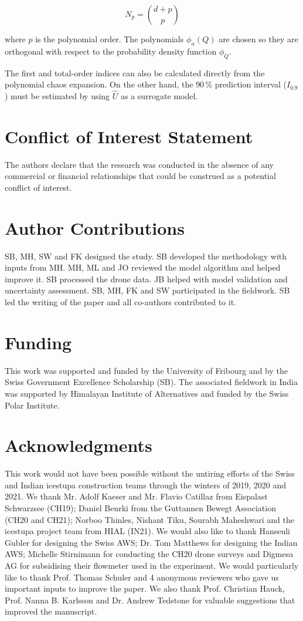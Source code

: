 \documentclass[utf8]{frontiersSCNS}
\begin{document}
\begin{equation}
  N_p = \binom{d+p}{p}
\end{equation}

where $p$ is the polynomial order. The polynomials $\phi_n(Q)$ are chosen so they are orthogonal with respect to the
probability density function $\phi_Q$.

The first and total-order indices can also be calculated directly from the polynomial chaos expansion. On the
other hand, the $90\, \%$ prediction interval ($I_{0.9}$) must be estimated by using $\hat{U}$ as a surrogate
model.

\section*{Conflict of Interest Statement} The authors declare that the research was conducted in the absence of
any commercial or financial relationships that could be construed as a potential conflict of interest.

\section*{Author Contributions} SB, MH, SW and FK designed the study.  SB developed the methodology with inputs
from MH.  MH, ML and JO reviewed the model algorithm and helped improve it. SB processed the drone data. JB helped
with model validation and uncertainty assessment. SB, MH, FK and SW participated in the fieldwork.  SB led the
writing of the paper and all co-authors contributed to it.

\section*{Funding} This work was supported and funded by the University of Fribourg and by the Swiss Government
Excellence Scholarship (SB). The associated fieldwork in India was supported by Himalayan Institute of
Alternatives and funded by the Swiss Polar Institute.

\section*{Acknowledgments} This work would not have been possible without the untiring efforts of the Swiss and
Indian icestupa construction teams through the winters of 2019, 2020 and 2021. We thank Mr. Adolf Kaeser and Mr.
Flavio Catillaz from Eispalast Schwarzsee (CH19); Daniel Beurki from the Guttannen Bewegt Association (CH20 and
CH21); Norboo Thinles, Nishant Tiku, Sourabh Maheshwari and the icestupa project team from HIAL (IN21).  We
would also like to thank Hanseuli Gubler for designing the Swiss AWS; Dr. Tom Matthews for designing the Indian
AWS; Michelle Stirnimann for conducting the CH20 drone surveys and Digmesa AG for subsidising their flowmeter
used in the experiment.  We would particularly like to thank Prof. Thomas Schuler and 4 anonymous reviewers who
gave us important inputs to improve the paper. We also thank Prof. Christian Hauck, Prof. Nanna B. Karlsson and
Dr. Andrew Tedstone for valuable suggestions that improved the manuscript.
\end{document}
